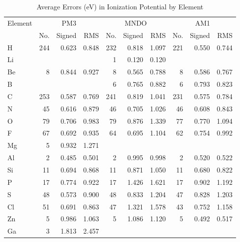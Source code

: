 \begin{table}
\caption{\label{eleips} Average Errors (eV) in Ionization Potential by Element}
\begin{center}
\begin{tabular}{lrrrrrrrrr}
Element & \multicolumn{3}{c}{PM3} & \multicolumn{3}{c}{MNDO} & \multicolumn{3}{c}{AM1} \\
 & No. & Signed &    RMS    & No. & Signed &    RMS    & No. & Signed &    RMS   \\ 
 \hline
  H & 244 &    0.623 &    0.848 & 232 &    0.818 &    1.097 & 221 &    0.550 &    0.744 \\
 Li &     &          &          &   1 &    0.120 &    0.120 &     &          &          \\
 Be &   8 &    0.844 &    0.927 &   8 &    0.565 &    0.788 &   8 &    0.586 &    0.767 \\
  B &     &          &          &   6 &    0.765 &    0.882 &   6 &    0.793 &    0.823 \\
  C & 253 &    0.587 &    0.769 & 241 &    0.819 &    1.041 & 231 &    0.575 &    0.784 \\
  N &  45 &    0.616 &    0.879 &  46 &    0.705 &    1.026 &  46 &    0.608 &    0.843 \\
  O &  79 &    0.706 &    0.983 &  79 &    0.876 &    1.339 &  77 &    0.770 &    1.094 \\
  F &  67 &    0.692 &    0.935 &  64 &    0.695 &    1.104 &  62 &    0.754 &    0.992 \\
 Mg &   5 &    0.932 &    1.271 &     &          &          &     &          &          \\
 Al &   2 &    0.485 &    0.501 &   2 &    0.995 &    0.998 &   2 &    0.520 &    0.522 \\
 Si &  11 &    0.694 &    0.868 &  11 &    0.871 &    1.050 &  11 &    0.680 &    0.822 \\
  P &  17 &    0.774 &    0.922 &  17 &    1.426 &    1.621 &  17 &    0.902 &    1.192 \\
  S &  48 &    0.573 &    0.900 &  48 &    0.833 &    1.204 &  47 &    0.828 &    1.203 \\
 Cl &  51 &    0.691 &    0.863 &  47 &    1.321 &    1.578 &  43 &    0.752 &    1.158 \\
 Zn &   5 &    0.986 &    1.063 &   5 &    1.086 &    1.120 &   5 &    0.492 &    0.517 \\
 Ga &   3 &    1.813 &    2.457 &     &          &          &     &          &          \\

\end{tabular}
\end{center}
\end{table}
